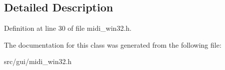 \subsection{Detailed Description}


Definition at line 30 of file midi\-\_\-win32.\-h.



The documentation for this class was generated from the following file\-:\begin{DoxyCompactItemize}
\item 
src/gui/midi\-\_\-win32.\-h\end{DoxyCompactItemize}
